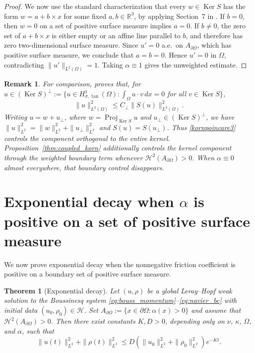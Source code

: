 \documentclass[11pt,reqno]{amsart}
\theoremstyle{plain}
\newtheorem{remark}[thm]{Remark}
\newtheorem{theorem}[thm]{Theorem}
\numberwithin{equation}{section}
\DeclareMathOperator{\kernel}{Ker}
\DeclareMathOperator{\Proj}{Proj}
\begin{document}
\begin{proof}
    We now use the standard characterization that every $w\in \kernel S$ has the form $w=a+b\times x$ for some fixed $a,b\in\mathbb{R}^3$,  by applying Section~7 in \cite{Kelliher2025}. If $b=0$, then $w=0$ on a set of positive surface measure implies $a=0$. If $b\neq 0$, the zero set of $a+b\times x$ is either empty or an affine line parallel to $b$, and therefore has zero two-dimensional surface measure. Since $u'=0$ a.e.\ on $A_{\partial\Omega}$, which has positive surface measure, we conclude that $a=b=0$. Hence $u'=0$ in $\Omega$, contradicting $\|u'\|_{L^2(\Omega)}=1$. Taking $\alpha\equiv1$ gives the unweighted estimate.
\end{proof}
\begin{remark}
For comparison, \cite[Proposition~5.1]{Kelliher2025} proves that, for $u\in (\kernel S)^\perp:=\{u\in H^1_{\sigma,\tan}(\Omega):\int_\Omega u\cdot v\,dx=0$ for all $v\in\kernel S\}$,
\begin{equation}\label{kornpoincare3}
\|u\|^2_{L^2(\Omega)}\le C_\perp\|S(u)\|^2_{L^2(\Omega)}.
\end{equation}
Writing $u=w+u_\perp$, where $w=\Proj_{\kernel S}u$ and
$u_\perp\in(\kernel S)^\perp$, we have
$\|u\|_{L^2}^2=\|w\|_{L^2}^2+\|u_\perp\|_{L^2}^2$ and
$S(u)=S(u_\perp)$. Thus \eqref{kornpoincare3} controls the component
orthogonal to the entire kernel. Proposition~\ref{thm:coupled_korn} additionally
controls the kernel component through the weighted boundary term whenever
$\mathcal H^2(A_{\partial\Omega})>0$. When $\alpha\equiv0$ almost everywhere,
that boundary control disappears.
\end{remark}






\section{Exponential decay when $\alpha$ is positive on a set of positive surface measure}\label{sec5}

We now prove exponential decay when the nonnegative friction coefficient is positive on a boundary set of positive surface measure.

\begin{theorem}[Exponential decay] \label{thm:main}
Let $(u,\rho)$ be a global Leray--Hopf weak solution to the Boussinesq system \eqref{eq:bouss_momentum}--\eqref{eq:navier_bc} with initial data $(u_0,\rho_0)\in\mathcal H$. Set $A_{\partial\Omega}:=\{x\in\partial\Omega:\alpha(x)>0\}$ and assume that $\mathcal H^2(A_{\partial\Omega})>0$. Then there exist constants $K,D>0$, depending only on $\nu$, $\kappa$, $\Omega$, and $\alpha$, such that 
\[
\| {u}(t)\|_{L^2}^2+\|\rho(t)\|_{L^2}^2\leq D\left(\|{u}_0\|_{L^2}^2+\|\rho_0 \|_{L^2}^2\right) e^{-Kt}.
\]
\end{theorem}
\end{document}
